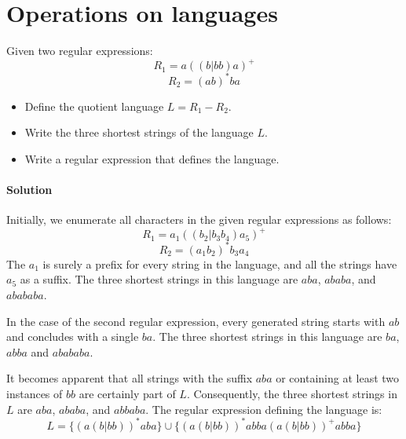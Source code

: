 \section{Operations on languages}

Given two regular expressions: 
\[R_1=a((b|bb)a)^{+}\] 
\[R_2=(ab)^{*}ba\]
\begin{itemize}
    \item Define the quotient language $L=R_1-R_2$. 
    \item Write the three shortest strings of the language $L$.
    \item Write a regular expression that defines the language. 
\end{itemize}

\paragraph{Solution}
Initially, we enumerate all characters in the given regular expressions as follows:
\[R_1=a_1((b_2|b_3b_4)a_5)^{+}\]
\[R_2=(a_1b_2)^{*}b_3a_4\]
The $a_1$ is surely a prefix for every string in the language, and all the strings have $a_5$ as a suffix. 
The three shortest strings in this language are $aba$, $ababa$, and $abababa$. 

In the case of the second regular expression, every generated string starts with $ab$ and concludes with a single $ba$.  
The three shortest strings in this language are $ba$, $abba$ and $abababa$. 

It becomes apparent that all strings with the suffix $aba$ or containing at least two instances of $bb$ are certainly part of $L$. 
Consequently, the three shortest strings in $L$ are $aba$, $ababa$, and $abbaba$. 
The regular expression defining the language is:
\[L=\{(a(b|bb))^{*}aba\} \cup \{(a(b|bb))^{*}abba(a(b|bb))^{+}abba\}\]